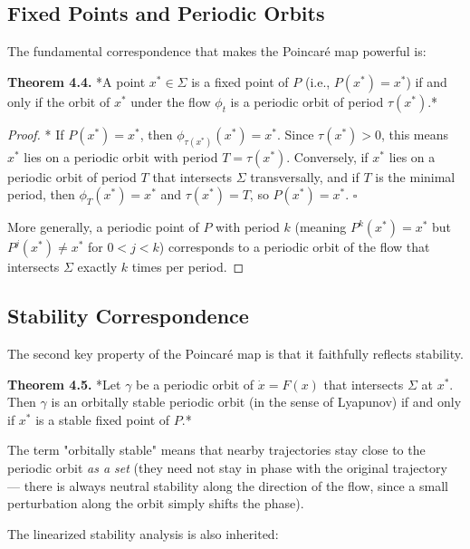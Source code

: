 \subsection{Fixed Points and Periodic Orbits}\label{sec:4.2.3}

The fundamental correspondence that makes the Poincaré map powerful is:

\textbf{Theorem 4.4.} *A point $x^* \in \Sigma$ is a fixed point of $P$ (i.e., $P(x^*) = x^*$) if and only if the orbit of $x^*$ under the flow $\phi_t$ is a periodic orbit of period $\tau(x^*)$.*

\begin{proof}
* If $P(x^*) = x^*$, then $\phi_{\tau(x^*)}(x^*) = x^*$. Since $\tau(x^*) > 0$, this means $x^*$ lies on a periodic orbit with period $T = \tau(x^*)$. Conversely, if $x^*$ lies on a periodic orbit of period $T$ that intersects $\Sigma$ transversally, and if $T$ is the minimal period, then $\phi_T(x^*) = x^*$ and $\tau(x^*) = T$, so $P(x^*) = x^*$. $\square$

More generally, a periodic point of $P$ with period $k$ (meaning $P^k(x^*) = x^*$ but $P^j(x^*) \neq x^*$ for $0 < j < k$) corresponds to a periodic orbit of the flow that intersects $\Sigma$ exactly $k$ times per period.

\end{proof}

\subsection{Stability Correspondence}\label{sec:4.2.4}

The second key property of the Poincaré map is that it faithfully reflects stability.

\textbf{Theorem 4.5.} *Let $\gamma$ be a periodic orbit of $\dot{x} = F(x)$ that intersects $\Sigma$ at $x^*$. Then $\gamma$ is an orbitally stable periodic orbit (in the sense of Lyapunov) if and only if $x^*$ is a stable fixed point of $P$.*

The term "orbitally stable" means that nearby trajectories stay close to the periodic orbit \textit{as a set} (they need not stay in phase with the original trajectory --- there is always neutral stability along the direction of the flow, since a small perturbation along the orbit simply shifts the phase).

The linearized stability analysis is also inherited:

